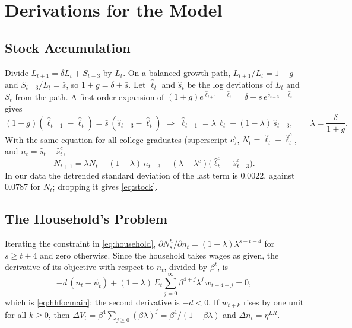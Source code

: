 \documentclass[12pt]{article}
\begin{document}



\appendix

\section{Derivations for the Model}\label{app:derivations}

\subsection{Stock Accumulation}\label{app:stock}

Divide $L_{t+1} = \delta L_t + S_{t-3}$ by $L_t$. On a balanced growth path, $L_{t+1}/L_t = 1+g$ and $S_{t-3}/L_t = \bar{s}$, so $1+g = \delta + \bar{s}$. Let $\hat{\ell}_t$ and $\hat{s}_t$ be the log deviations of $L_t$ and $S_t$ from the path. A first-order expansion of $(1+g)e^{\hat{\ell}_{t+1} - \hat{\ell}_t} = \delta + \bar{s}\,e^{\hat{s}_{t-3} - \hat{\ell}_t}$ gives
\[
  (1+g)(\hat{\ell}_{t+1} - \hat{\ell}_t) = \bar{s}\,(\hat{s}_{t-3} - \hat{\ell}_t)
  \;\Longrightarrow\;
  \hat{\ell}_{t+1} = \lambda\,\hat{\ell}_t + (1-\lambda)\,\hat{s}_{t-3}, \qquad \lambda = \frac{\delta}{1+g} .
\]
With the same equation for all college graduates (superscript $c$), $N_t = \hat{\ell}_t - \hat{\ell}^{c}_t$, and $n_t = \hat{s}_t - \hat{s}^{c}_t$,
\[
  N_{t+1} = \lambda N_t + (1-\lambda)\, n_{t-3} + (\lambda - \lambda^{c})\big(\hat{\ell}^{c}_t - \hat{s}^{c}_{t-3}\big) .
\]
In our data the detrended standard deviation of the last term is 0.0022, against 0.0787 for $N_t$; dropping it gives \eqref{eq:stock}.

\subsection{The Household's Problem}\label{app:household}

Iterating the constraint in \eqref{eq:household}, $\partial N^{h}_{s}/\partial n_t = (1-\lambda)\lambda^{s-t-4}$ for $s \ge t+4$ and zero otherwise. Since the household takes wages as given, the derivative of its objective with respect to $n_t$, divided by $\beta^{t}$, is
\[
  -d\,(n_t - \psi_t) + (1-\lambda)\, E_t \sum_{j=0}^{\infty} \beta^{4+j} \lambda^{j}\, w_{t+4+j} = 0 ,
\]
which is \eqref{eq:hhfocmain}; the second derivative is $-d<0$. If $w_{t+k}$ rises by one unit for all $k \ge 0$, then $\Delta V_t = \beta^{4}\sum_{j\ge0}(\beta\lambda)^{j} = \beta^{4}/(1-\beta\lambda)$ and $\Delta n_t = \eta^{LR}$.
\end{document}
